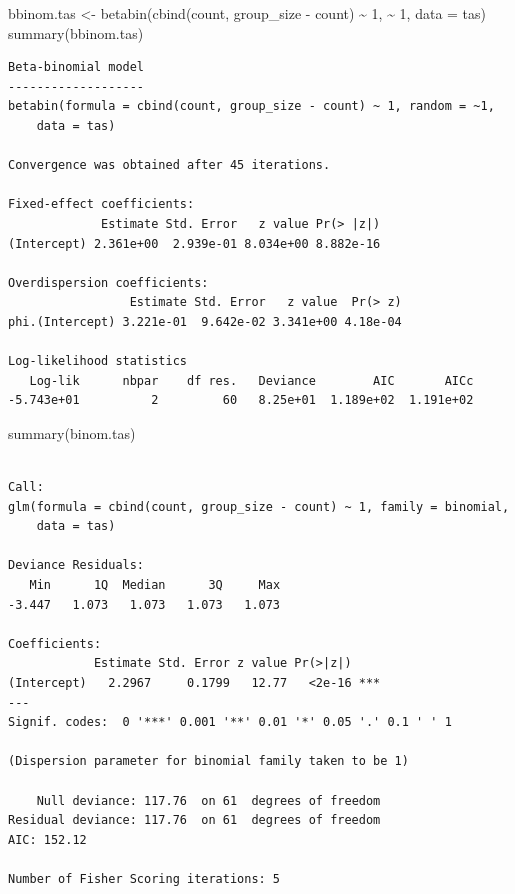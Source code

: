 \documentclass[
  letterpaper,
  DIV=11,
  numbers=noendperiod]{scrreprt}
\newenvironment{Shaded}{\begin{snugshade}}{\end{snugshade}}
\newcommand{\AttributeTok}[1]{\textcolor[rgb]{0.40,0.45,0.13}{#1}}
\newcommand{\DecValTok}[1]{\textcolor[rgb]{0.68,0.00,0.00}{#1}}
\newcommand{\FunctionTok}[1]{\textcolor[rgb]{0.28,0.35,0.67}{#1}}
\newcommand{\NormalTok}[1]{\textcolor[rgb]{0.00,0.23,0.31}{#1}}
\newcommand{\OtherTok}[1]{\textcolor[rgb]{0.00,0.23,0.31}{#1}}
\newcommand{\SpecialCharTok}[1]{\textcolor[rgb]{0.37,0.37,0.37}{#1}}
\begin{document}
\begin{Shaded}
\begin{Highlighting}[]
\NormalTok{bbinom.tas }\OtherTok{\textless{}{-}}
  \FunctionTok{betabin}\NormalTok{(}\FunctionTok{cbind}\NormalTok{(count, group\_size }\SpecialCharTok{{-}}\NormalTok{ count) }\SpecialCharTok{\textasciitilde{}} \DecValTok{1}\NormalTok{, }\SpecialCharTok{\textasciitilde{}} \DecValTok{1}\NormalTok{, }\AttributeTok{data =}\NormalTok{ tas)}
\FunctionTok{summary}\NormalTok{(bbinom.tas)}
\end{Highlighting}
\end{Shaded}

\begin{verbatim}
Beta-binomial model
-------------------
betabin(formula = cbind(count, group_size - count) ~ 1, random = ~1, 
    data = tas)

Convergence was obtained after 45 iterations.

Fixed-effect coefficients:
             Estimate Std. Error   z value Pr(> |z|)
(Intercept) 2.361e+00  2.939e-01 8.034e+00 8.882e-16

Overdispersion coefficients:
                 Estimate Std. Error   z value  Pr(> z)
phi.(Intercept) 3.221e-01  9.642e-02 3.341e+00 4.18e-04

Log-likelihood statistics
   Log-lik      nbpar    df res.   Deviance        AIC       AICc 
-5.743e+01          2         60   8.25e+01  1.189e+02  1.191e+02 
\end{verbatim}

\begin{Shaded}
\begin{Highlighting}[]
\FunctionTok{summary}\NormalTok{(binom.tas)}
\end{Highlighting}
\end{Shaded}

\begin{verbatim}

Call:
glm(formula = cbind(count, group_size - count) ~ 1, family = binomial, 
    data = tas)

Deviance Residuals: 
   Min      1Q  Median      3Q     Max  
-3.447   1.073   1.073   1.073   1.073  

Coefficients:
            Estimate Std. Error z value Pr(>|z|)    
(Intercept)   2.2967     0.1799   12.77   <2e-16 ***
---
Signif. codes:  0 '***' 0.001 '**' 0.01 '*' 0.05 '.' 0.1 ' ' 1

(Dispersion parameter for binomial family taken to be 1)

    Null deviance: 117.76  on 61  degrees of freedom
Residual deviance: 117.76  on 61  degrees of freedom
AIC: 152.12

Number of Fisher Scoring iterations: 5
\end{verbatim}
\end{document}
